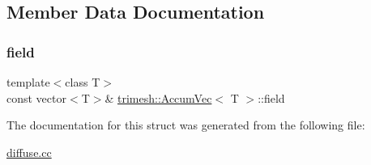 \subsection{Member Data Documentation}
\mbox{\label{structtrimesh_1_1AccumVec_aefbc404dfe8f74fc5f16f6fcaa85cbc4}} 
\subsubsection{\texorpdfstring{field}{field}}
{\footnotesize\ttfamily template$<$class T$>$ \\
const vector$<$T$>$\& \hyperlink{structtrimesh_1_1AccumVec}{trimesh\+::\+Accum\+Vec}$<$ T $>$\+::field}



The documentation for this struct was generated from the following file\+:\begin{DoxyCompactItemize}
\item 
\hyperlink{diffuse_8cc}{diffuse.\+cc}\end{DoxyCompactItemize}
